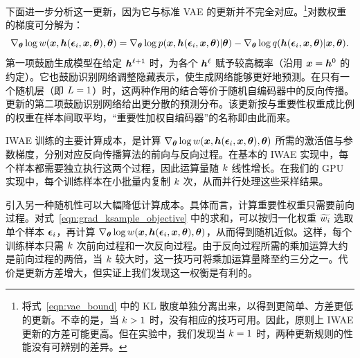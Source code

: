 下面进一步分析这一更新，因为它与标准 VAE 的更新并不完全对应。\footnote{\citet{vae} 将式~\eqref{eqn:vae_bound} 中的 KL 散度单独分离出来，以得到更简单、方差更低的更新。不幸的是，当 $k>1$ 时，没有相应的技巧可用。因此，原则上 IWAE 更新的方差可能更高。但在实验中，我们发现当 $k=1$ 时，两种更新规则的性能没有可辨别的差异。}对数权重的梯度可分解为：
\begin{equation}
\nabla_{\bm{\theta}} \log w(\bm{x}, \bm{h}(\bm{\epsilon}_{i}, \bm{x}, {\bm{\theta}}), {\bm{\theta}}) = \nabla_{\bm{\theta}} \log p(\bm{x},\bm{h}(\bm{\epsilon}_{i}, \bm{x}, {\bm{\theta}})|{\bm{\theta}}) - \nabla_{\bm{\theta}} \log q(\bm{h}(\bm{\epsilon}_{i}, \bm{x}, {\bm{\theta}})|\bm{x},{\bm{\theta}}).\label{eq:source-15}
\end{equation}
第一项鼓励生成模型在给定 $\bm{h}^{\ell+1}$ 时，为各个 $\bm{h}^{\ell}$ 赋予较高概率（沿用 $\bm{x}=\bm{h}^{0}$ 的约定）。它也鼓励识别网络调整隐藏表示，使生成网络能够更好地预测。在只有一个随机层（即 $L=1$）时，这两种作用的结合等价于随机自编码器中的反向传播。更新的第二项鼓励识别网络给出更分散的预测分布。该更新按与重要性权重成比例的权重在样本间取平均，“重要性加权自编码器”的名称即由此而来。

IWAE 训练的主要计算成本，是计算 $\nabla_{\bm{\theta}}\log w(\bm{x},\bm{h}(\bm{\epsilon}_{i},\bm{x},{\bm{\theta}}),{\bm{\theta}})$ 所需的激活值与参数梯度，分别对应反向传播算法的前向与反向过程。在基本的 IWAE 实现中，每个样本都需要独立执行这两个过程，因此运算量随 $k$ 线性增长。在我们的 GPU 实现中，每个训练样本在小批量内复制 $k$ 次，从而并行处理这些采样结果。

引入另一种随机性可以大幅降低计算成本。具体而言，计算重要性权重只需要前向过程。对式~\eqref{eqn:grad_ksample_objective} 中的求和，可以按归一化权重 $\widetilde{w_{i}}$ 选取单个样本 $\bm{\epsilon}_{i}$，再计算 $\nabla_{\bm{\theta}}\log w(\bm{x},\bm{h}(\bm{\epsilon}_{i},\bm{x},{\bm{\theta}}),{\bm{\theta}})$，从而得到随机近似。这样，每个训练样本只需 $k$ 次前向过程和一次反向过程。由于反向过程所需的乘加运算大约是前向过程的两倍，当 $k$ 较大时，这一技巧可将乘加运算量降至约三分之一。代价是更新方差增大，但实证上我们发现这一权衡是有利的。
